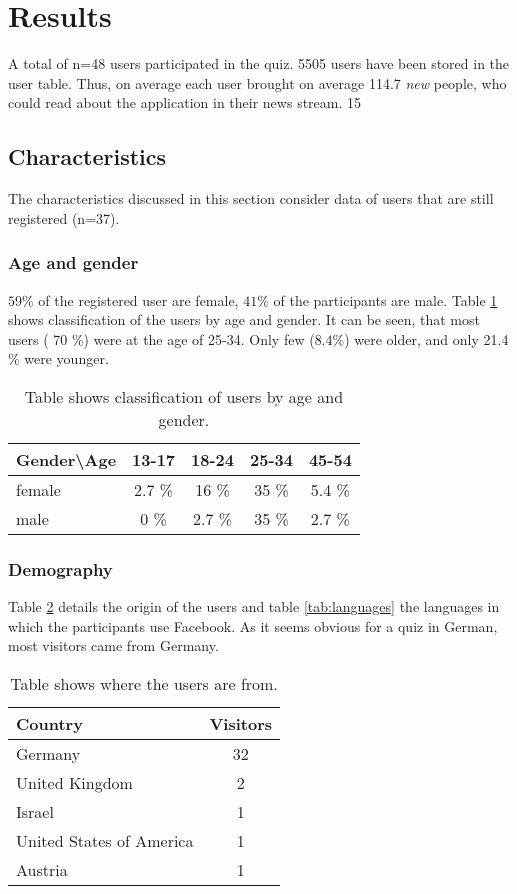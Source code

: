 \documentclass[preprint,12pt]{elsarticle}
\begin{document}
\section{Results}
\label{sec:results}
A total of n=48 users participated in the quiz. 5505 users have been
stored in the user table. Thus, on average each user brought on
average 114.7 \textit{new} people, who could read about the application
in their news stream. 15 

\subsection{Characteristics}
\label{sec:characteristics}

The characteristics discussed in this section consider data of users
that are still registered (n=37). 

\subsubsection{Age and gender}
\label{sec:age-gender}
$59 \%$ of the registered user are female, $41 \%$ of the participants
are male. Table \ref{tab:agegender} shows classification of the users
by age and gender. It can be seen, that most users ( 70 \%) were at
the age of 25-34. Only few ($8.4 \%$) were older, and only 21.4 \%
were younger.

\begin{center}
\begin{table}
\label{tab:agegender}
\begin{tabular}{l | c c c c}
Gender\textbackslash Age  & 13-17 & 18-24 & 25-34 & 45-54 \\
\hline
female  & 2.7 \% & 16 \% & 35 \% & 5.4 \% \\
male & 0 \% & 2.7 \% & 35 \% & 2.7 \% 
\end{tabular}
\caption{Table shows classification of users by age and gender.}
\end{table}
\end{center}

\subsubsection{Demography}
\label{sec:demographie}
Table \ref{tab:countries} details the origin of the users and table
\ref{tab:languages} the languages in which the participants use Facebook.
As it seems obvious for a quiz in German, most visitors came from Germany.

\begin{center}
\begin{table}
\label{tab:countries}
\begin{tabular}{l | c }
Country  & Visitors \\
\hline
Germany  & 32 \\
United Kingdom & 2 \\
Israel & 1 \\
United States of America & 1 \\
Austria & 1 \\
\end{tabular}
\caption{Table shows where the users are from.}
\end{table}
\end{center}
\end{document}
